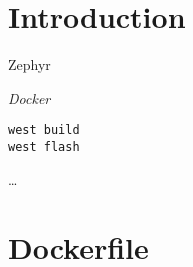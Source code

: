 



\puttitle{}

\section{Introduction}

Zephyr \zephyrversion{}

\emph{Docker}


\begin{lstlisting}
west build
west flash
\end{lstlisting}

\begin{infobox}
 \dots
\end{infobox}

\newpage

\appendix

\section{Dockerfile}\label{dockerfile}





